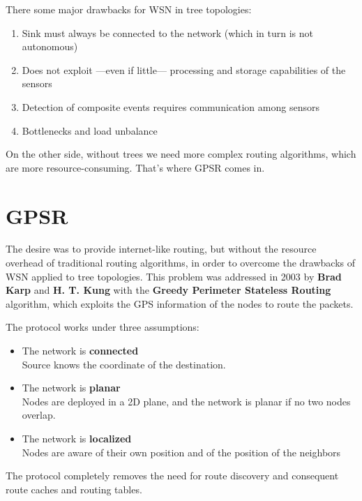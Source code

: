 There some major drawbacks for WSN in tree topologies:
\begin{enumerate}
   \item Sink must always be connected to the network (which in turn is not autonomous) 
   \item Does not exploit ---even if little--- processing and storage capabilities of the sensors
   \item Detection of composite events requires communication among sensors
   \item Bottlenecks and load unbalance
\end{enumerate}

On the other side, without trees we need more complex routing algorithms, which are more resource-consuming. That's where GPSR comes in.

\section{GPSR}
The desire was to provide internet-like routing, but without the resource overhead of traditional routing algorithms, in order to overcome the drawbacks of WSN applied to tree topologies.
This problem was addressed in 2003 by \textbf{Brad Karp} and \textbf{H. T. Kung} with the \textbf{Greedy Perimeter Stateless Routing} algorithm, which exploits the GPS information of the nodes to route the packets.

The protocol works under three assumptions:
\begin{itemize}
   \item The network is \textbf{connected}\\
   Source knows the coordinate of the destination.
   \item The network is \textbf{planar}\\
   Nodes are deployed in a 2D plane, and the network is planar if no two nodes overlap.
   \item The network is \textbf{localized}\\
   Nodes are aware of their own position and of the position of the neighbors
\end{itemize}
The protocol completely removes the need for route discovery and consequent route caches and routing tables.

\newpage
